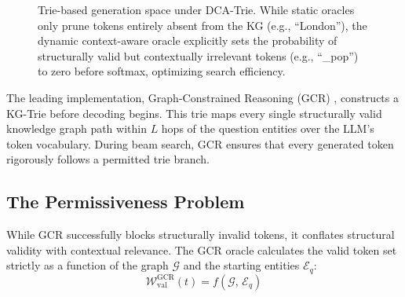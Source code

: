 \documentclass[11pt, letterpaper]{article}
\begin{document}
\begin{figure}[htbp]
{
    }
    \vspace{0.3cm}
    \caption{Trie-based generation space under DCA-Trie. While static oracles only prune tokens entirely absent from the KG (e.g., ``London''), the dynamic context-aware oracle explicitly sets the probability of structurally valid but contextually irrelevant tokens (e.g., ``\_pop'') to zero before softmax, optimizing search efficiency.}
    \label{fig:kg_trie_search}
\end{figure}

The leading implementation, Graph-Constrained Reasoning (GCR) \citep{luo2025-graph-constrained-reasoning}, constructs a KG-Trie before decoding begins. This trie maps every single structurally valid knowledge graph path within $L$ hops of the question entities over the LLM's token vocabulary. During beam search, GCR ensures that every generated token rigorously follows a permitted trie branch.

\subsection{The Permissiveness Problem}

While GCR successfully blocks structurally invalid tokens, it conflates structural validity with contextual relevance. The GCR oracle calculates the valid token set strictly as a function of the graph $\mathcal{G}$ and the starting entities $\mathcal{E}_q$:
\begin{equation}
    \mathcal{W}_{\text{val}}^{\text{GCR}}(t) = f(\mathcal{G},\, \mathcal{E}_q)
\end{equation}
\end{document}
